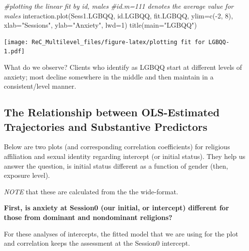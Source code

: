\documentclass[
  11pt,
]{book}
\newenvironment{Shaded}{\begin{snugshade}}{\end{snugshade}}
\newcommand{\AttributeTok}[1]{\textcolor[rgb]{0.77,0.63,0.00}{#1}}
\newcommand{\CommentTok}[1]{\textcolor[rgb]{0.56,0.35,0.01}{\textit{#1}}}
\newcommand{\DecValTok}[1]{\textcolor[rgb]{0.00,0.00,0.81}{#1}}
\newcommand{\FunctionTok}[1]{\textcolor[rgb]{0.00,0.00,0.00}{#1}}
\newcommand{\NormalTok}[1]{#1}
\newcommand{\SpecialCharTok}[1]{\textcolor[rgb]{0.00,0.00,0.00}{#1}}
\newcommand{\StringTok}[1]{\textcolor[rgb]{0.31,0.60,0.02}{#1}}
\begin{document}
\begin{Shaded}
\begin{Highlighting}[]
\CommentTok{\#plotting the linear fit by id, males}
\CommentTok{\#id.m=111 denotes the average value for males}
\FunctionTok{interaction.plot}\NormalTok{(Sess1.LGBQQ, id.LGBQQ, fit.LGBQQ, }\AttributeTok{ylim=}\FunctionTok{c}\NormalTok{(}\SpecialCharTok{{-}}\DecValTok{2}\NormalTok{, }\DecValTok{8}\NormalTok{), }\AttributeTok{xlab=}\StringTok{"Sessions"}\NormalTok{, }\AttributeTok{ylab=}\StringTok{"Anxiety"}\NormalTok{, }\AttributeTok{lwd=}\DecValTok{1}\NormalTok{)}
\FunctionTok{title}\NormalTok{(}\AttributeTok{main=}\StringTok{"LGBQQ"}\NormalTok{)}
\end{Highlighting}
\end{Shaded}

\texttt{[image: ReC\_Multilevel\_files/figure-latex/plotting fit for LGBQQ-1.pdf]}

What do we observe? Clients who identify as LGBQQ start at different levels of anxiety; most decline somewhere in the middle and then maintain in a consistent/level manner.

\hypertarget{the-relationship-between-ols-estimated-trajectories-and-substantive-predictors}{%
\subsection{The Relationship between OLS-Estimated Trajectories and Substantive Predictors}\label{the-relationship-between-ols-estimated-trajectories-and-substantive-predictors}}

Below are two plots (and corresponding correlation coefficients) for religious affiliation and sexual identity regarding intercept (or initial status). They help us answer the question, is initial status different as a function of gender (then, exposure level).

\emph{NOTE} that these are calculated from the the wide-format.

\textbf{First, is anxiety at Session0 (our initial, or intercept) different for those from dominant and nondominant religions?}

For these analyses of intercepts, the fitted model that we are using for the plot and correlation keeps the assessment at the Session0 intercept.

\begin{Shaded}
\end{Shaded}
\end{document}
